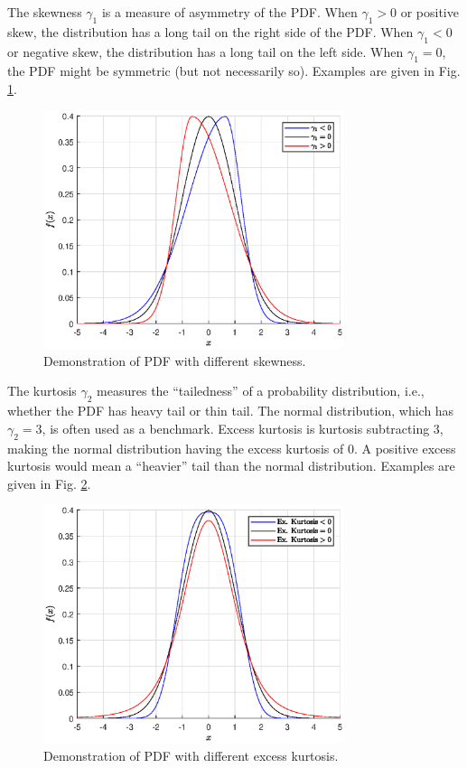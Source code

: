 The skewness $\gamma_1$ is a measure of asymmetry of the PDF. When $\gamma_1 > 0$ or positive skew, the distribution has a long tail on the right side of the PDF. When $\gamma_1 <0$ or negative skew, the distribution has a long tail on the left side. When $\gamma_1 = 0$, the PDF might be symmetric (but not necessarily so). Examples are given in Fig. \ref{fig:skewness_demo}.
\begin{figure}[!htb]
	\centering
	\includegraphics[width=250pt]{chapters/part-1/figures/skewness_demo.eps}
	\caption{Demonstration of PDF with different skewness.} \label{fig:skewness_demo}
\end{figure}

The kurtosis $\gamma_2$ measures the ``tailedness'' of a probability distribution, i.e., whether the PDF has heavy tail or thin tail. The normal distribution, which has $\gamma_2=3$, is often used as a benchmark. Excess kurtosis is kurtosis subtracting $3$, making the normal distribution having the excess kurtosis of $0$. A positive excess kurtosis would mean a ``heavier'' tail than the normal distribution. Examples are given in Fig. \ref{fig:kurtosis_demo}.
\begin{figure}[!htb]
	\centering
	\includegraphics[width=250pt]{chapters/part-1/figures/kurtosis_demo.eps}
	\caption{Demonstration of PDF with different excess kurtosis.} \label{fig:kurtosis_demo}
\end{figure}

